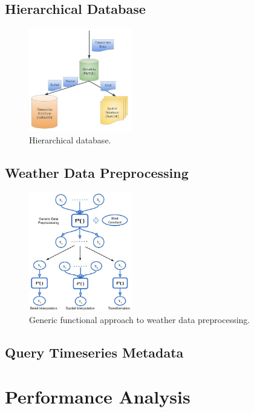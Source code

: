\documentclass[conference]{IEEEtran}
\begin{document}
\subsection{Hierarchical Database}
\begin{figure}[htbp]
\centerline{\includegraphics[width=0.4\textwidth]{method/microservice/hierarchical_database.jpg}}
\caption{Hierarchical database.}
\label{fi:hierarchical_database}
\end{figure}

\subsection{Weather Data Preprocessing}
\begin{figure}[htbp]
\centerline{\includegraphics[width=0.4\textwidth]{method/data_preprocess/summary_weather_data_preprocessing.jpg}}
\caption{Generic functional approach to weather data preprocessing.}
\label{fi:summary_weather_data_preprocessing}
\end{figure}

\subsection{Query Timeseries Metadata}


\section{Performance Analysis}
\end{document}
